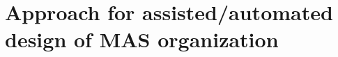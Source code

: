 \documentclass[runningheads]{llncs}
\begin{document}




\section{Approach for assisted/automated design of MAS organization}
\end{document}
